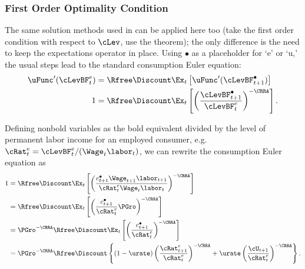 \documentclass{handout}
\begin{document}
\subsubsection{First Order Optimality Condition}

The same solution methods used in  can 
be applied here too (take the first order condition with respect to $\cLev$, use
the  theorem); the only difference is the need to keep the expectations operator
in place.  Using $\bullet$ as a placeholder for `e' or `u,' the
usual steps lead to the standard consumption Euler equation:
\begin{equation}\begin{gathered}\begin{aligned}
        \uFunc^{\prime}(\cLevBF^{e}_{t}) & =  \Rfree\Discount \Ex_{t}\left[\uFunc^{\prime}(\cLevBF^{\bullet}_{t+1}) \right]
\\  1         & =  \Rfree\Discount \Ex_{t}\left[\left(\frac{\cLevBF^{\bullet}_{t+1}}{\cLevBF^{e}_{t}}\right)^{-\CRRA} \right]
.
\end{aligned}\end{gathered}\end{equation}

Defining nonbold variables as the bold equivalent divided
by the level of permanent labor income for an employed consumer, e.g.\ ${\cRat}^{e}_{t}=\cLevBF^{e}_{t}/(\Wage_{t}\labor_{t})$, we can rewrite the
consumption Euler equation as
\begin{equation}\begin{gathered}\begin{aligned}
  1         & =  \Rfree\Discount \Ex_{t}\left[\left(\frac{{c}^{\bullet}_{t+1} \Wage_{t+1}\labor_{t+1}}{{\cRat}^{e}_{t} \Wage_{t}\labor_{t}}\right)^{-\CRRA} \right]  
\\          & =  \Rfree\Discount \Ex_{t}\left[\left(\frac{{c}^{\bullet}_{t+1}}{{\cRat}^{e}_{t}}\PGro\right)^{-\CRRA} \right]
\\          & =  \PGro^{-\CRRA}\Rfree\Discount \Ex_{t}\left[\left(\frac{{c}^{\bullet}_{t+1}}{{\cRat}^{e}_{t}}\right)^{-\CRRA} \right] 
\\          & =  \PGro^{-\CRRA}\Rfree\Discount \left\{(1-\urate)\left(\frac{{\cRat}^{e}_{t+1}}{{\cRat}^{e}_{t}}\right)^{-\CRRA}+\urate \left(\frac{\cU_{t+1}}{{\cRat}^{e}_{t}}\right)^{-\CRRA}\right\} \label{eq:Explicit}.
\end{aligned}\end{gathered}\end{equation}
\end{document}
